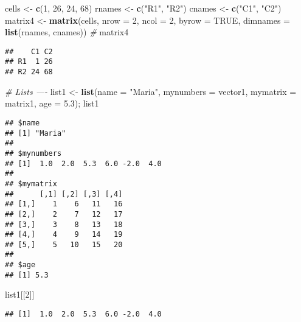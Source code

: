 \documentclass[]{article}
\newenvironment{Shaded}{\begin{snugshade}}{\end{snugshade}}
\newcommand{\CommentTok}[1]{\textcolor[rgb]{0.56,0.35,0.01}{\textit{#1}}}
\newcommand{\DataTypeTok}[1]{\textcolor[rgb]{0.13,0.29,0.53}{#1}}
\newcommand{\DecValTok}[1]{\textcolor[rgb]{0.00,0.00,0.81}{#1}}
\newcommand{\FloatTok}[1]{\textcolor[rgb]{0.00,0.00,0.81}{#1}}
\newcommand{\KeywordTok}[1]{\textcolor[rgb]{0.13,0.29,0.53}{\textbf{#1}}}
\newcommand{\NormalTok}[1]{#1}
\newcommand{\OtherTok}[1]{\textcolor[rgb]{0.56,0.35,0.01}{#1}}
\newcommand{\StringTok}[1]{\textcolor[rgb]{0.31,0.60,0.02}{#1}}
\begin{document}
\begin{Shaded}
\begin{Highlighting}[]
\NormalTok{cells <-}\StringTok{ }\KeywordTok{c}\NormalTok{(}\DecValTok{1}\NormalTok{, }\DecValTok{26}\NormalTok{, }\DecValTok{24}\NormalTok{, }\DecValTok{68}\NormalTok{)}
\NormalTok{rnames <-}\StringTok{ }\KeywordTok{c}\NormalTok{(}\StringTok{"R1"}\NormalTok{, }\StringTok{"R2"}\NormalTok{)}
\NormalTok{cnames <-}\StringTok{ }\KeywordTok{c}\NormalTok{(}\StringTok{"C1"}\NormalTok{, }\StringTok{"C2"}\NormalTok{) }
\NormalTok{matrix4 <-}\StringTok{ }\KeywordTok{matrix}\NormalTok{(cells, }\DataTypeTok{nrow =} \DecValTok{2}\NormalTok{, }\DataTypeTok{ncol =} \DecValTok{2}\NormalTok{, }\DataTypeTok{byrow =} \OtherTok{TRUE}\NormalTok{,}
  \DataTypeTok{dimnames =} \KeywordTok{list}\NormalTok{(rnames, cnames)) }\CommentTok{# }
\NormalTok{matrix4}
\end{Highlighting}
\end{Shaded}

\begin{verbatim}
##    C1 C2
## R1  1 26
## R2 24 68
\end{verbatim}

\begin{Shaded}
\begin{Highlighting}[]
\CommentTok{# Lists ---- }
\NormalTok{list1 <-}\StringTok{ }\KeywordTok{list}\NormalTok{(}\DataTypeTok{name =} \StringTok{"Maria"}\NormalTok{, }\DataTypeTok{mynumbers =}\NormalTok{ vector1, }\DataTypeTok{mymatrix =}\NormalTok{ matrix1, }\DataTypeTok{age =} \FloatTok{5.3}\NormalTok{); list1}
\end{Highlighting}
\end{Shaded}

\begin{verbatim}
## $name
## [1] "Maria"
## 
## $mynumbers
## [1]  1.0  2.0  5.3  6.0 -2.0  4.0
## 
## $mymatrix
##      [,1] [,2] [,3] [,4]
## [1,]    1    6   11   16
## [2,]    2    7   12   17
## [3,]    3    8   13   18
## [4,]    4    9   14   19
## [5,]    5   10   15   20
## 
## $age
## [1] 5.3
\end{verbatim}

\begin{Shaded}
\begin{Highlighting}[]
\NormalTok{list1[[}\DecValTok{2}\NormalTok{]]}
\end{Highlighting}
\end{Shaded}

\begin{verbatim}
## [1]  1.0  2.0  5.3  6.0 -2.0  4.0
\end{verbatim}
\end{document}

